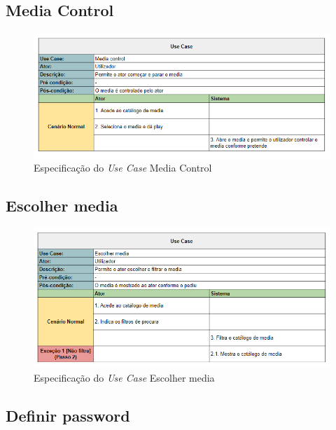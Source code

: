 \documentclass[a4paper]{report}
\begin{document}
\subsection{Media Control}

\begin{figure}[H]
	\centering 
    \includegraphics[width=\textwidth]{images/Media_Control.png}  
    \caption{Especificação do \emph{Use Case} Media Control}
\end{figure}

\subsection{Escolher media}

\begin{figure}[H]
	\centering 
    \includegraphics[width=\textwidth]{images/Escolher_Media.png}  
    \caption{Especificação do \emph{Use Case} Escolher media}
\end{figure}

\subsection{Definir password}
\end{document}

